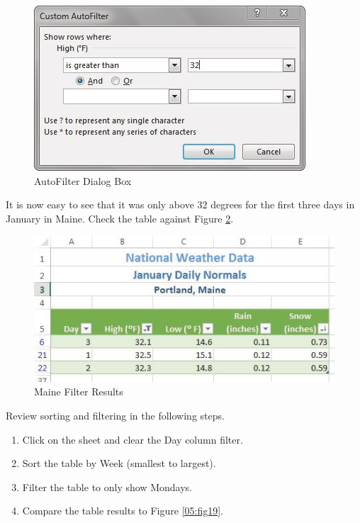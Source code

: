 \begin{figure}[H]
	\centering
	\includegraphics[width=\maxwidth{.95\linewidth}]{gfx/ch05_fig17}
	\caption{AutoFilter Dialog Box}
	\label{05:fig17}
\end{figure}

It is now easy to see that it was only above $ 32 $ degrees for the first three days in January in Maine. Check the table against Figure \ref{05:fig18}.

\begin{figure}[H]
	\centering
	\includegraphics[width=\maxwidth{.95\linewidth}]{gfx/ch05_fig18}
	\caption{Maine Filter Results}
	\label{05:fig18}
\end{figure}

Review sorting and filtering in the following steps.

\begin{enumerate}
	\item Click on the  sheet and clear the Day column filter.
	\item Sort the table by Week (smallest to largest).
	\item Filter the table to only show Mondays.
	\item Compare the table results to Figure \ref{05:fig19}.
\end{enumerate}

